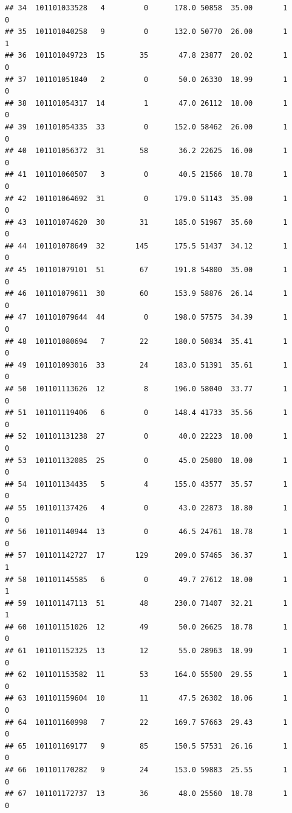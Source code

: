 \documentclass[
]{article}
\begin{document}
\begin{verbatim}
## 34  101101033528   4         0      178.0 50858  35.00       1          0
## 35  101101040258   9         0      132.0 50770  26.00       1          1
## 36  101101049723  15        35       47.8 23877  20.02       1          0
## 37  101101051840   2         0       50.0 26330  18.99       1          0
## 38  101101054317  14         1       47.0 26112  18.00       1          0
## 39  101101054335  33         0      152.0 58462  26.00       1          0
## 40  101101056372  31        58       36.2 22625  16.00       1          0
## 41  101101060507   3         0       40.5 21566  18.78       1          0
## 42  101101064692  31         0      179.0 51143  35.00       1          0
## 43  101101074620  30        31      185.0 51967  35.60       1          0
## 44  101101078649  32       145      175.5 51437  34.12       1          0
## 45  101101079101  51        67      191.8 54800  35.00       1          0
## 46  101101079611  30        60      153.9 58876  26.14       1          0
## 47  101101079644  44         0      198.0 57575  34.39       1          0
## 48  101101080694   7        22      180.0 50834  35.41       1          0
## 49  101101093016  33        24      183.0 51391  35.61       1          0
## 50  101101113626  12         8      196.0 58040  33.77       1          0
## 51  101101119406   6         0      148.4 41733  35.56       1          0
## 52  101101131238  27         0       40.0 22223  18.00       1          0
## 53  101101132085  25         0       45.0 25000  18.00       1          0
## 54  101101134435   5         4      155.0 43577  35.57       1          0
## 55  101101137426   4         0       43.0 22873  18.80       1          0
## 56  101101140944  13         0       46.5 24761  18.78       1          0
## 57  101101142727  17       129      209.0 57465  36.37       1          1
## 58  101101145585   6         0       49.7 27612  18.00       1          1
## 59  101101147113  51        48      230.0 71407  32.21       1          1
## 60  101101151026  12        49       50.0 26625  18.78       1          0
## 61  101101152325  13        12       55.0 28963  18.99       1          0
## 62  101101153582  11        53      164.0 55500  29.55       1          0
## 63  101101159604  10        11       47.5 26302  18.06       1          0
## 64  101101160998   7        22      169.7 57663  29.43       1          0
## 65  101101169177   9        85      150.5 57531  26.16       1          0
## 66  101101170282   9        24      153.0 59883  25.55       1          0
## 67  101101172737  13        36       48.0 25560  18.78       1          0

\end{verbatim}
\end{document}
